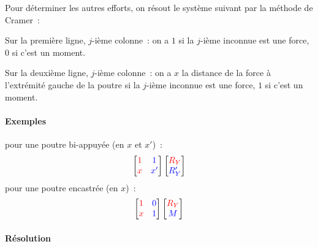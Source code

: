 \documentclass[draft]{report}
\begin{document}
Pour déterminer les autres efforts, on résout le système suivant par la méthode de Cramer~:

Sur la première ligne, $j$-ième colonne~: on a $1$ si la $j$-ième inconnue est une force, $0$ si c'est un moment.

Sur la deuxième ligne, $j$-ième colonne~: on a $x$ la distance de la force à l'extrémité gauche de la poutre si la $j$-ième inconnue est une force, $1$ si c'est un moment.

\paragraph{Exemples} pour une poutre bi-appuyée (en $x$ et $x'$)~:
\[ \begin{bmatrix}
\textcolor{red}{1} & \textcolor{blue}{1} \\
\textcolor{red}{x} & \textcolor{blue}{x'} \\
\end{bmatrix}
\begin{bmatrix}
\textcolor{red}{R_Y} \\
\textcolor{blue}{R_Y'}
\end{bmatrix}\]
pour une poutre encastrée (en $x$)~:
\[ \begin{bmatrix}
\textcolor{red}{1} & \textcolor{blue}{0} \\
\textcolor{red}{x} & \textcolor{blue}{1} \\
\end{bmatrix} 
\begin{bmatrix}
\textcolor{red}{R_Y} \\
\textcolor{blue}{M}
\end{bmatrix}\]

\paragraph{Résolution}

\end{document}
